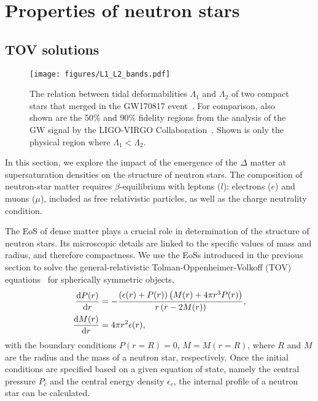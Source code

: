 \documentclass[preprint,showkeys,lengthcheck,nofootinbib,twocolumn,notitlepage,floatfix,superscriptaddress]{revtex4-1}
\newcommand{\dd}{\mathrm{d}}
\begin{document}
\section{Properties of neutron stars}
\label{sec:neutron_stars}

\subsection{TOV solutions}
\label{sec:tov}

\begin{figure}[t!]
  \centering
  \texttt{[image: figures/L1\_L2\_bands.pdf]}
  \caption{The relation between tidal deformabilities $\Lambda_1$ and $\Lambda_2$ of two compact stars that merged in the GW170817 event~\cite{Abbott:2018exr}. For comparison, also shown are the 50\% and 90\% fidelity regions from the analysis of the GW signal by the LIGO-VIRGO Collaboration~\cite{Abbott:2018exr}. Shown is only the physical region where $\Lambda_1 < \Lambda_2$.}
  \label{fig:L1_L2_band}
\end{figure}


In this section, we explore the impact of the emergence of the $\Delta$ matter at supersaturation densities on the structure of neutron stars. The composition of neutron-star matter requires $\beta$-equilibrium with leptons ($l$): electrons ($e$) and muons ($\mu$), included as free relativistic particles, as well as the charge neutrality condition. 

The EoS of dense matter plays a crucial role in determination of the structure of neutron stars. Its microscopic details are linked to the specific values of mass and radius, and therefore compactness. We use the EoSs introduced in the previous section to solve the general-relativistic Tolman-Oppenheimer-Volkoff (TOV) equations~\cite{Tolman:1939jz, Oppenheimer:1939ne} for spherically symmetric objects, 
\begin{subequations}\label{eq:TOV_eqs}
\begin{align}
   \frac{\dd P(r)}{\dd r} &= -\frac{\left(\epsilon(r) + P(r)\right)\left(M(r) + 4\pi r^3 P(r)\right)}{r \left(r-2M(r)\right)} \textrm,\\
   \frac{\dd M(r)}{\dd r} &= 4\pi r^2 \epsilon(r)\textrm,
\end{align}
\end{subequations}
with the boundary conditions \mbox{$P(r=R) = 0$}, \mbox{$M = M(r=R)$}, where $R$ and $M$ are the radius and the mass of a neutron star, respectively. Once the initial conditions are specified based on a given equation of state, namely the central pressure $P_c$ and the central energy density $\epsilon_c$, the internal profile of a neutron star can be calculated. 
\end{document}
